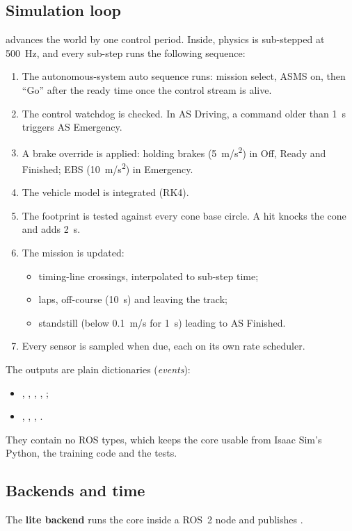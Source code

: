 \documentclass[11pt]{article}
\begin{document}
\subsection{Simulation loop}
 advances the world by one control period. Inside, physics is sub-stepped at
\SI{500}{Hz}, and every sub-step runs the following sequence:
\begin{enumerate}
  \item The autonomous-system auto sequence runs: mission select, ASMS on, then ``Go'' after the ready time once
        the control stream is alive.
  \item The control watchdog is checked. In AS Driving, a command older than \SI{1}{s} triggers AS Emergency.
  \item A brake override is applied: holding brakes (\SI{5}{m/s^2}) in Off, Ready and Finished; EBS
        (\SI{10}{m/s^2}) in Emergency.
  \item The vehicle model is integrated (RK4).
  \item The footprint is tested against every cone base circle. A hit knocks the cone and adds \SI{2}{s}.
  \item The mission is updated:
        \begin{itemize}
          \item timing-line crossings, interpolated to sub-step time;
          \item laps, off-course (\SI{10}{s}) and leaving the track;
          \item standstill (below \SI{0.1}{m/s} for \SI{1}{s}) leading to AS Finished.
        \end{itemize}
  \item Every sensor is sampled when due, each on its own rate scheduler.
\end{enumerate}
The outputs are plain dictionaries (\emph{events}):
\begin{itemize}
  \item {}, , , , ;
  \item {}, , , .
\end{itemize}
They contain no ROS types, which keeps the core usable from Isaac Sim's Python, the training code and the tests.

\subsection{Backends and time}
The \textbf{lite backend} runs the core inside a ROS~2 node and publishes .
\end{document}
